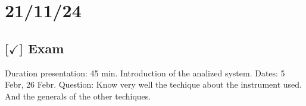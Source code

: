 \section{21/11/24}

\subsection{[$\checkmark$] Exam}

Duration presentation: 45 min. Introduction of the analized system. Dates: 5 Febr, 26 Febr. Question: Know very well the techique about the instrument used. And the generals of the other techiques.